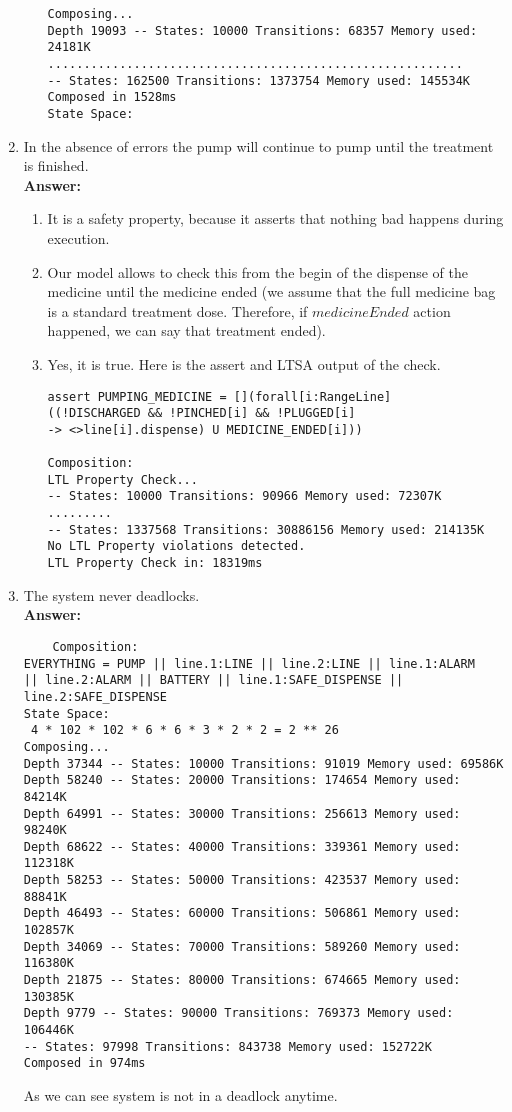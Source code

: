 \documentclass{article}
\begin{document}
\begin{enumerate}
\begin{enumerate}
\begin{verbatim}
Composing...
Depth 19093 -- States: 10000 Transitions: 68357 Memory used: 24181K
..........................................................
-- States: 162500 Transitions: 1373754 Memory used: 145534K
Composed in 1528ms
State Space:
\end{verbatim}
	\end{enumerate}
    \item In the absence of errors the pump will continue to pump until the
treatment is finished.\\
    \textbf{Answer:} 
    \begin{enumerate}
    	\item It is a safety property, because it asserts that nothing bad happens during execution.
    	\item Our model allows to check this from the begin of the dispense of the medicine until the medicine ended 
    	(we assume that the full medicine bag is a standard treatment dose. Therefore, if $medicineEnded$ action happened, we can say that treatment ended).
    	\item Yes, it is true. Here is the assert and LTSA output of the check.
\begin{verbatim}
assert PUMPING_MEDICINE = [](forall[i:RangeLine] 
((!DISCHARGED && !PINCHED[i] && !PLUGGED[i] 
-> <>line[i].dispense) U MEDICINE_ENDED[i]))

Composition:
LTL Property Check...
-- States: 10000 Transitions: 90966 Memory used: 72307K
.........
-- States: 1337568 Transitions: 30886156 Memory used: 214135K
No LTL Property violations detected.
LTL Property Check in: 18319ms
\end{verbatim}
	\end{enumerate}
    \item The system never deadlocks.\\
    \textbf{Answer:}
    \begin{verbatim}
    Composition:
EVERYTHING = PUMP || line.1:LINE || line.2:LINE || line.1:ALARM 
|| line.2:ALARM || BATTERY || line.1:SAFE_DISPENSE || line.2:SAFE_DISPENSE
State Space:
 4 * 102 * 102 * 6 * 6 * 3 * 2 * 2 = 2 ** 26
Composing...
Depth 37344 -- States: 10000 Transitions: 91019 Memory used: 69586K
Depth 58240 -- States: 20000 Transitions: 174654 Memory used: 84214K
Depth 64991 -- States: 30000 Transitions: 256613 Memory used: 98240K
Depth 68622 -- States: 40000 Transitions: 339361 Memory used: 112318K
Depth 58253 -- States: 50000 Transitions: 423537 Memory used: 88841K
Depth 46493 -- States: 60000 Transitions: 506861 Memory used: 102857K
Depth 34069 -- States: 70000 Transitions: 589260 Memory used: 116380K
Depth 21875 -- States: 80000 Transitions: 674665 Memory used: 130385K
Depth 9779 -- States: 90000 Transitions: 769373 Memory used: 106446K
-- States: 97998 Transitions: 843738 Memory used: 152722K
Composed in 974ms
    \end{verbatim}
    As we can see system is not in a deadlock anytime.
    

\end{enumerate}
\end{document}

